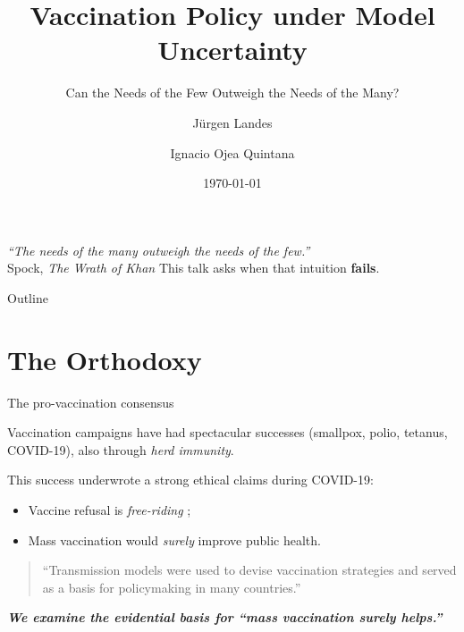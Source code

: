 \documentclass{if-beamer}
\title[The Needs of the Few]{Vaccination Policy under Model Uncertainty}
\subtitle{Can the Needs of the Few Outweigh the Needs of the Many?}
\author[Landes \& Ojea Quintana]{J\"urgen Landes \and Ignacio Ojea Quintana}
\institute[MCMP, LMU]{
  Munich Center for Mathematical Philosophy\\
  LMU Munich\\
  juergen\_landes@yahoo.de}
\date{\today}
\begin{document}
\frame{\titlepage}

\begin{frame}{}
  \vfill
  \centering
  {\Large\itshape ``The needs of the many outweigh the needs of the few.''}\\[1em]
  \normalsize Spock, \emph{The Wrath of Khan}
  \vfill
  \pause
  \centering
  This talk asks when that intuition \textbf{fails}.
\end{frame}

\begin{frame}{Outline}
  \tableofcontents
\end{frame}

\section{The Orthodoxy}
\begin{frame}{The pro-vaccination consensus}
\justifying

Vaccination campaigns have had spectacular successes (smallpox, polio, tetanus, COVID-19), also through \emph{herd immunity}.

\strut
\pause

This success underwrote a strong ethical claims during COVID-19:
\begin{itemize}
  \item Vaccine refusal is \emph{free-riding} \autocite{Hoven2012,Giubilini2018};
  \item Mass vaccination would \emph{surely} improve public health.
\end{itemize}

\strut

\pause
\begin{quote}\small
``Transmission models were used to devise vaccination strategies and served as a basis for policymaking in many countries.'' \autocite[3]{Rouzine2023}
\end{quote}

\strut

\pause
\textbf{\textit{We examine the evidential basis for ``mass vaccination surely helps.''}}
\end{frame}

\end{document}
